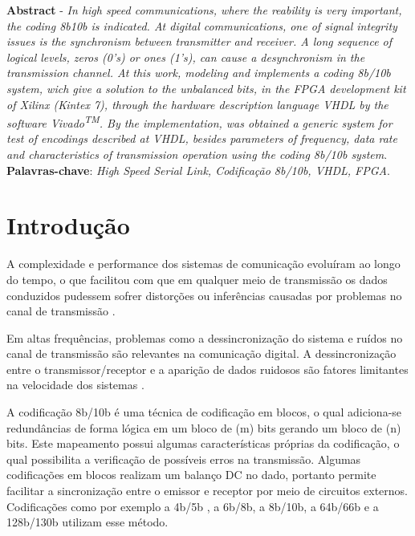 \documentclass[11pt,twocolumn]{article}
\begin{document}
\thispagestyle{empty}

\noindent\textbf{Abstract} - \textit{ In high speed communications, where the reability is very important, the coding 8b10b is indicated. At digital communications, one of signal integrity issues is the synchronism between transmitter and receiver. A long sequence of logical levels, zeros (0's) or ones (1's), can cause a desynchronism in the transmission channel. At this work, modeling and implements a coding 8b/10b system, wich give a solution to the unbalanced 	bits, in the FPGA development kit of Xilinx (Kintex 7), through the hardware description language VHDL by the software Vivado\textsuperscript{TM}. By the implementation, was obtained a generic system for test of encodings described at VHDL, besides parameters of frequency, data rate and characteristics of transmission operation using the coding 8b/10b system}. 
\newline \textbf{Palavras-chave}: \textit{High Speed Serial Link, Codificação 8b/10b, VHDL, FPGA}.

\section{Introdução}

A complexidade e performance dos sistemas de comunicação evoluíram ao longo do tempo, o que facilitou com que em qualquer meio de transmissão os dados conduzidos pudessem sofrer distorções ou inferências causadas por problemas no canal de transmissão \cite{Borges}. 

Em altas frequências, problemas como a dessincronização do sistema e ruídos no canal de transmissão são relevantes na comunicação digital. A dessincronização entre o transmissor/receptor e a aparição de dados ruidosos são fatores limitantes na velocidade dos sistemas \cite{pra}. 

A codificação 8b/10b é uma técnica de codificação em blocos, o qual adiciona-se redundâncias de forma lógica em um bloco de (m) bits gerando um bloco de (n) bits. Este mapeamento possui algumas características próprias da codificação, o qual possibilita a verificação de possíveis erros na transmissão. Algumas codificações em blocos realizam um balanço DC no dado, portanto permite facilitar a sincronização entre o emissor e receptor por meio de circuitos externos. Codificações como por exemplo a 4b/5b , a 6b/8b, a 8b/10b, a 64b/66b e a 128b/130b utilizam esse método\cite{Fourouzan}.
\end{document}
